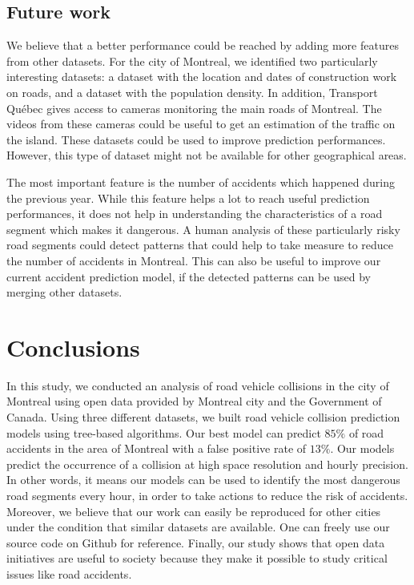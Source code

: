 \documentclass[conference]{IEEEtran}
\begin{document}

\subsection{Future work}

We believe that a better performance could be reached by adding more features
from other datasets. For the city of Montreal, we identified two
particularly interesting datasets: a dataset with the location and dates of
construction work on roads, and a dataset with the population density.
In addition, Transport Qu\'ebec gives access to cameras monitoring the main
roads of Montreal. The videos from these cameras could be useful to get an
estimation of the traffic on the island. 
These datasets could be used to improve prediction performances.
However, this type of dataset might not be available for other geographical areas.

The most important feature is the number of accidents which happened during
the previous year. While this feature helps a lot to reach useful prediction
performances, it does not help in understanding the characteristics of a
road segment which makes it dangerous. A human analysis of these
particularly risky road segments could detect patterns that could help to
take measure to reduce the number of accidents in Montreal. This can also
be useful to improve our current accident prediction model, if the detected
patterns can be used by merging other datasets.


\section{Conclusions}

In this study, we conducted an analysis of road vehicle collisions in the
city of Montreal using open data provided by Montreal city and the Government of Canada. 
Using three different datasets, we built road vehicle collision
prediction models using tree-based algorithms. Our best model can predict $85\%$ of road accidents in the area of Montreal with a false positive rate of $13\%$. 
Our models predict the occurrence of a collision at high space resolution and hourly precision. In other words, it
means our models can be used to identify the most dangerous road
segments every hour, in order to take actions to reduce the risk of accidents. 
Moreover, we believe that our work
can easily be reproduced for other cities under the condition that similar 
datasets are available. One can freely use our source code on Github for reference.
Finally, our study shows that open data initiatives are useful to society because they make it possible to study critical issues like road
accidents.
\end{document}
